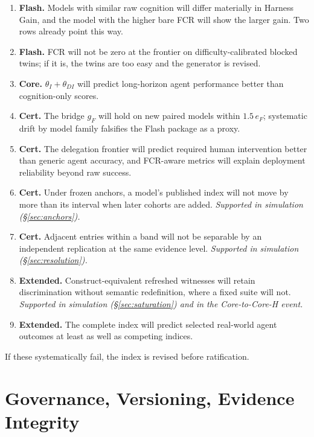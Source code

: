 \documentclass[11pt]{article}
\theoremstyle{definition}
\begin{document}
\begin{enumerate}[leftmargin=1.6em,itemsep=1pt]
\item \textbf{Flash.} Models with similar raw cognition will differ materially in Harness Gain, and the model with the higher bare FCR will show the larger gain. Two rows already point this way.
\item \textbf{Flash.} FCR will not be zero at the frontier on difficulty-calibrated blocked twins; if it is, the twins are too easy and the generator is revised.
\item \textbf{Core.} $\theta_I + \theta_{DI}$ will predict long-horizon agent performance better than cognition-only scores.
\item \textbf{Cert.} The bridge $g_F$ will hold on new paired models within $1.5\,e_F$; systematic drift by model family falsifies the Flash package as a proxy.
\item \textbf{Cert.} The delegation frontier will predict required human intervention better than generic agent accuracy, and FCR-aware metrics will explain deployment reliability beyond raw success.
\item \textbf{Cert.} Under frozen anchors, a model's published index will not move by more than its interval when later cohorts are added. \emph{Supported in simulation (\S\ref{sec:anchors}).}
\item \textbf{Cert.} Adjacent entries within a band will not be separable by an independent replication at the same evidence level. \emph{Supported in simulation (\S\ref{sec:resolution}).}
\item \textbf{Extended.} Construct-equivalent refreshed witnesses will retain discrimination without semantic redefinition, where a fixed suite will not. \emph{Supported in simulation (\S\ref{sec:saturation}) and in the Core-to-Core-H event.}
\item \textbf{Extended.} The complete index will predict selected real-world agent outcomes at least as well as competing indices.
\end{enumerate}
If these systematically fail, the index is revised before ratification.

\section{Governance, Versioning, Evidence Integrity}\label{sec:governance}
\end{document}
